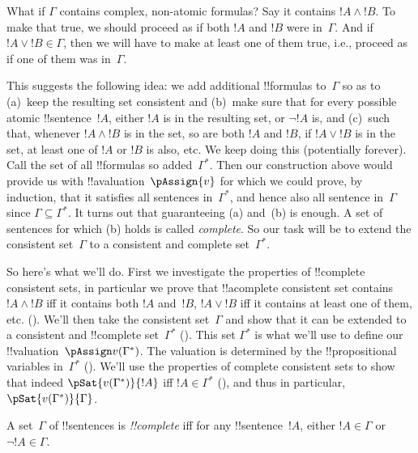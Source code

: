 What if $\Gamma$ contains complex, non-atomic formulas? Say it
contains $!A \land !B$. To make that true, we should proceed as if
both $!A$ and $!B$ were in~$\Gamma$.  And if $!A \lor !B \in \Gamma$,
then we will have to make at least one of them true, i.e., proceed as
if one of them was in~$\Gamma$.

This suggests the following idea: we add additional !!{formula}s
to~$\Gamma$ so as to (a)~keep the resulting set consistent and
(b)~make sure that for every possible atomic !!{sentence}~$!A$, either
$!A$ is in the resulting set, or $\lnot !A$ is, and (c)~such that,
whenever $!A \land !B$ is in the set, so are both $!A$ and $!B$, if
$!A \lor !B$ is in the set, at least one of $!A$ or $!B$ is also, etc.
We keep doing this (potentially forever).  Call the set of all
!!{formula}s so added~$\Gamma^*$.  Then our construction above would
provide us with !!a{valuation}~$\pAssign{v}$
for which we could prove, by induction, that it satisfies all sentences
in~$\Gamma^*$, and hence also all sentence in~$\Gamma$
since $\Gamma \subseteq \Gamma^*$.  It turns out that guaranteeing (a)
and~(b) is enough. A set of sentences for which (b) holds is called
\emph{complete}. So our task will be to extend the consistent
set~$\Gamma$ to a consistent and complete set~$\Gamma^*$.



So here's what we'll do. First we investigate the properties of
!!{complete} consistent sets, in particular we prove that
!!a{complete} consistent set contains $!A \land !B$ iff it contains
both $!A$ and~$!B$, $!A \lor !B$ iff it contains at least one of them,
etc. ().
We'll then take the consistent
set~$\Gamma$ and show that it can be extended
to a consistent and
!!{complete} set~$\Gamma^*$ (). This set
$\Gamma^*$ is what we'll use to define our !!{valuation}~$\pAssign v(\Gamma^*)$.
The valuation is determined by the !!{propositional
    variable}s in~$\Gamma^*$ ().  We'll
use the properties of complete consistent
sets to show that indeed
$\pSat{v(\Gamma^*)}{!A}$ iff $!A \in
\Gamma^*$ (), and thus in particular,
$\pSat{v(\Gamma^*)}{\Gamma}$.






      

\begin{defn}
 A set~$\Gamma$ of !!{sentence}s is
\emph{!!{complete}} iff for any !!{sentence}~$!A$, either $!A \in
\Gamma$ or $\lnot !A \in \Gamma$.
\end{defn}


